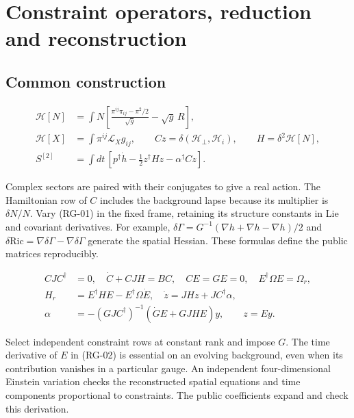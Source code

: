 \section{Constraint operators, reduction and reconstruction}

\subsection{Common construction}

\begin{equation}\tag{RG-01}\label{eq:RG-01}
\begin{aligned}
\mathcal H[N]&=\int N\left[\frac{\pi^{ij}\pi_{ij}-\pi^2/2}{\sqrt g}-\sqrt g\,R\right],\\
\mathcal H[X]&=\int\pi^{ij}\mathcal L_Xg_{ij},\qquad
Cz=\delta(\mathcal H_\perp,\mathcal H_i),\qquad
H=\delta^2\mathcal H[N],\\
S^{[2]}&=\int dt\,[p^\dagger\dot h-\tfrac12z^\dagger Hz-\alpha^\dagger Cz].
\end{aligned}
\end{equation}

Complex sectors are paired with their conjugates to give a real action. The Hamiltonian row of $C$ includes the background lapse because its multiplier is $\delta N/N$. Vary (RG-01) in the fixed frame, retaining its structure constants in Lie and covariant derivatives. For example, $\delta\Gamma=G^{-1}(\nabla h+\nabla h-\nabla h)/2$ and $\delta\mathrm{Ric}=\nabla\delta\Gamma-\nabla\delta\Gamma$ generate the spatial Hessian. These formulas define the public matrices reproducibly.

\begin{equation}\tag{RG-02}\label{eq:RG-02}
\begin{aligned}
CJC^\dagger&=0,\quad \dot C+CJH=BC,\quad
CE=GE=0,\quad E^\dagger\Omega E=\Omega_r,\\
H_r&=E^\dagger HE-E^\dagger\Omega\dot E,\quad
\dot z=JHz+JC^\dagger\alpha,\\
\alpha&=-(GJC^\dagger)^{-1}(\dot GE+GJHE)y,\qquad z=Ey.
\end{aligned}
\end{equation}

Select independent constraint rows at constant rank and impose $G$. The time derivative of $E$ in (RG-02) is essential on an evolving background, even when its contribution vanishes in a particular gauge. An independent four-dimensional Einstein variation checks the reconstructed spatial equations and time components proportional to constraints. The public coefficients expand and check this derivation.

